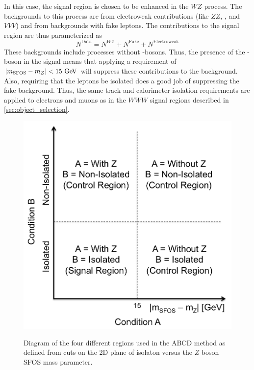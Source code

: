 In this case, the signal region is chosen to be enhanced in the $WZ$ process.
The backgrounds to this process are from electroweak contributions (like
$ZZ$, \ttV, and $VVV$) and from backgrounds with fake leptons.
The contributions to the signal region are thus parameterized as
\begin{equation}
\label{eq:wzparam}
N^{\textrm{Data}} =  N^{WZ} + N^{\textrm{Fake}} + N^{\textrm{Electroweak}}
\end{equation}
These backgrounds include processes without \z-bosons.
Thus, the presence of the \z-boson in the signal means that applying a \z
requirement of 
$|m_{\textrm{SFOS}}-m_{\z}|<15\GeV$
will suppress these contributions to the background.
Also, requiring that the leptons be isolated does a good job of 
suppressing the fake background.
Thus, the same track and calorimeter isolation requirements
are applied to electrons and muons as in the $WWW$ signal regions
described in \sec\ref{sec:object_selection}.



\begin{figure}[ht]
\centering
\includegraphics[width=.6\textwidth]{figures/abcd.png}
\label{fig:abcd_diagram}
\caption{Diagram of the four different regions used in the ABCD method
as defined from cuts on the 2D plane of isolaton versus the
$Z$ boson SFOS mass parameter.}
\end{figure}

